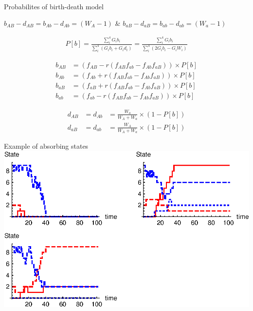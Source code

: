 \documentclass{beamer}
\begin{document}
\begin{frame}{Probabilites of birth-death model}

    $b_{AB}-d_{AB} = b_{Ab}-d_{Ab}=(W_A-1)$ \& $b_{aB}-d_{aB} = b_{ab}-d_{ab}=(W_a-1)$
    
    \begin{equation*}
    \begin{aligned}
        P[b] = \frac{\sum_i^4 G_i b_i}{\sum_i^4 (G_i b_i + G_i d_i)} = \frac{\sum_i^4 G_i b_i}{\sum_i^4 (2 G_i b_i - G_i W_i)}
    \end{aligned}
    \end{equation*}
    
    \begin{equation*}
    \begin{aligned}
        b_{AB} &= (f_{AB}-r(f_{AB}f_{ab}-f_{Ab}f_{aB}))\times P[b]\\
        b_{Ab} &= (f_{Ab}+r(f_{AB}f_{ab}-f_{Ab}f_{aB}))\times P[b]\\
        b_{aB} &= (f_{aB}+r(f_{AB}f_{ab}-f_{Ab}f_{aB}))\times P[b]\\
        b_{ab} &= (f_{ab}-r(f_{AB}f_{ab}-f_{Ab}f_{aB}))\times P[b]
    \end{aligned}
    \end{equation*} 
    
    \begin{equation*}
    \begin{aligned}
        d_{AB} &= d_{Ab} &= \frac{W_a}{W_A+W_a}\times (1-P[b]) \\
        d_{aB} &= d_{ab} &= \frac{W_A}{W_A+W_a}\times (1-P[b]) 
    \end{aligned}
    \end{equation*}
    
  
    
\end{frame}

\begin{frame}{Example of absorbing states}
    \includegraphics{Figures/gridplot.eps}
\end{frame}
\end{document}
